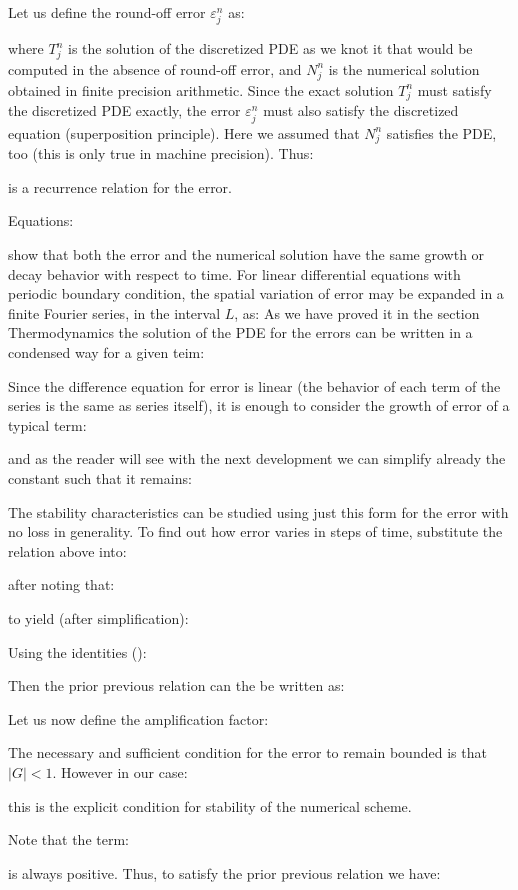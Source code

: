 	Let us define the round-off error $\varepsilon_j^n$ as:
	
	where $T_j^n$ is the solution of the discretized PDE as we knot it that would be computed in the absence of round-off error, and $N_j^n$ is the numerical solution obtained in finite precision arithmetic. Since the exact solution $T_j^n$ must satisfy the discretized PDE exactly, the error $\varepsilon_j^n$ must also satisfy the discretized equation (superposition principle). Here we assumed that $N_j^n$ satisfies the PDE, too (this is only true in machine precision). Thus:
	
	is a recurrence relation for the error. 

	Equations:
	
	show that both the error and the numerical solution have the same growth or decay behavior with respect to time. For linear differential equations with periodic boundary condition, the spatial variation of error may be expanded in a finite Fourier series, in the interval $L$, as:
	As we have proved it in the section Thermodynamics the solution of the PDE for the errors can be written in a condensed way for a given teim:
	
	Since the difference equation for error is linear (the behavior of each term of the series is the same as series itself), it is enough to consider the growth of error of a typical term:
	
	and as the reader will see with the next development we can simplify already the constant such that it remains:
	
	The stability characteristics can be studied using just this form for the error with no loss in generality. To find out how error varies in steps of time, substitute the relation above into:
	
	after noting that:
	
	to yield (after simplification):
	
	Using the identities ():
	
	Then the prior previous relation can the be written as:
	
	Let us now define the amplification factor:
	
	The necessary and sufficient condition for the error to remain bounded is that $|G|<1$. However in our case:
	
	this is the explicit condition for stability of the numerical scheme.
	
	Note that the term:
	
	is always positive. Thus, to satisfy the prior previous relation we have:
	
